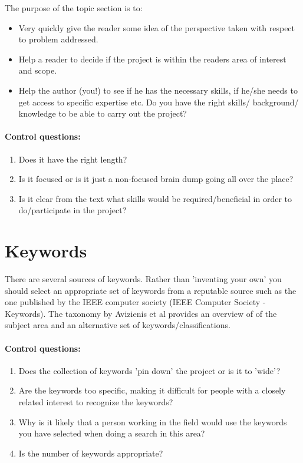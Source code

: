 \documentclass[informationsecurity]{gucmasterproject}
\begin{document}
The purpose of the topic section is to:
\begin{itemize}
\item Very quickly give the reader some idea of the perspective taken
with respect to problem addressed.  
\item Help a reader to decide if the project
is within the readers area of interest and scope.
\item Help the author (you!) to see if he has the necessary skills,
if he/she needs to get access to specific expertise etc.
Do you have the right skills/ background/ knowledge
to be able to carry out the project?
\end{itemize}

\paragraph{Control questions:}
\begin{enumerate}
\item Does it have the right length?
\item Is it focused or is it just a non-focused brain dump going all over the place?
\item Is it clear from the text what skills would be required/beneficial in order to do/participate in the project?
\end{enumerate}


\section{Keywords}
There are several sources of keywords. Rather than 'inventing your own' you should select an appropriate set of keywords from a reputable source such as the one published by the IEEE computer society (IEEE Computer Society - Keywords).
The taxonomy by Avizienis et al\cite{Avizienis2004} provides an overview of of the subject area and an alternative set of keywords/classifications.

\paragraph{Control questions:}
\begin{enumerate}
\item Does the collection of keywords 'pin down' the project or is it to 'wide'?
\item Are the keywords too specific, making it difficult  for people with a closely related interest to recognize the keywords?
\item Why is it likely that a person working in the field would use the keywords you have selected when doing a search in this area?
\item Is the number of keywords appropriate?
\end{enumerate}
\end{document}

